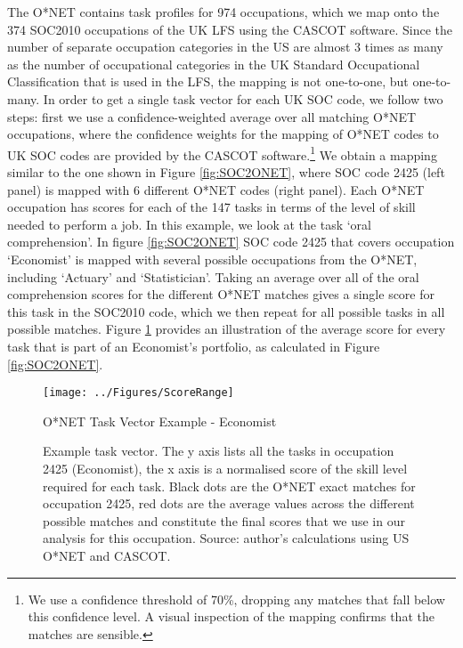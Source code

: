 \documentclass[preprint,12pt,authoryear]{elsarticle}
\begin{document}
The O*NET contains task profiles for 974 occupations, which we map onto the 374 SOC2010 occupations of the UK LFS using the CASCOT software. Since the number of separate occupation categories in the US are almost 3 times as many as the number of occupational categories in the UK Standard Occupational Classification that is used in the LFS, the mapping is not one-to-one, but one-to-many. In order to get a single task vector for each UK SOC code, we follow two steps: first we use a confidence-weighted average over all matching O*NET occupations, where the confidence weights for the mapping of O*NET codes to UK SOC codes are provided by the CASCOT software.\footnote{We use a confidence threshold of 70\%, dropping any matches that fall below this confidence level. A visual inspection of the mapping confirms that the matches are sensible.} We obtain a mapping similar to the one shown in Figure \ref{fig:SOC2ONET}, where SOC code 2425 (left panel) is mapped with 6 different O*NET codes (right panel). Each O*NET occupation has scores for each of the 147 tasks in terms of the level of skill needed to perform a job. In this example, we look at the task `oral comprehension'. In figure \ref{fig:SOC2ONET} SOC code 2425 that covers occupation `Economist' is mapped with several possible occupations from the O*NET, including `Actuary' and `Statistician'. Taking an average over all of the oral comprehension scores for the different O*NET matches gives a single score for this task in the SOC2010 code, which we then repeat for all possible tasks in all possible matches. Figure \ref{fig:ONETScoreRange} provides an illustration of the average score for every task that is part of an Economist's portfolio, as calculated in Figure \ref{fig:SOC2ONET}.

\begin{landscape}
	\begin{figure}[h!]
		\centering
		\texttt{[image: ../Figures/ScoreRange]}
		\caption{O*NET Task Vector Example - Economist}
		\caption*{\footnotesize{Example task vector. The y axis lists all the tasks in occupation 2425 (Economist), the x axis is a normalised score of the skill level required for each task. Black dots are the O*NET exact matches for occupation 2425, red dots are the average values across the different possible matches and constitute the final scores that we use in our analysis for this occupation. Source: author's calculations using US O*NET and CASCOT.}}
		\label{fig:ONETScoreRange}
	\end{figure}
\end{landscape}
\end{document}
